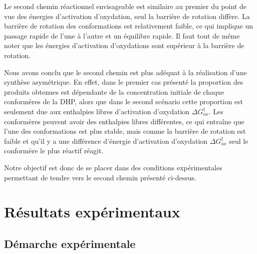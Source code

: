 \documentclass{article}
\begin{document}
Le second chemin réactionnel envisageable est similaire au premier du point de vue des énergies d’activation d’oxydation, seul la barrière de rotation diffère. La barrière de rotation des conformations est relativement faible, ce qui implique un passage rapide de l'une à l'autre et un équilibre rapide. Il faut tout de même noter que les énergies d’activation d’oxydations sont supérieur à la barrière de rotation.
\medbreak

Nous avons conclu que le second chemin est plus adéquat à la réalisation d’une synthèse asymétrique. En effet, dans le premier cas présenté la proportion des produits obtenues est dépendante de la concentration initiale de chaque conformères de la DHP, alors que dans le second scénario cette proportion est seulement due aux enthalpies libres d'activation d’oxydation $\Delta G^\ddagger_{ox}$. Les conformères peuvent avoir des enthalpies libres différentes, ce qui entraîne que l'une des conformations est plus stable, mais comme la barrière de rotation est faible et qu'il y a une différence d’énergie d’activation d’oxydation  $\Delta G^\ddagger_{ox}$ seul le conformère le plus réactif réagit.
\medbreak

Notre objectif est donc de se placer dans des conditions expérimentales permettant de tendre vers le second chemin présenté ci-dessus.



\newpage


\section{Résultats expérimentaux}



\subsection{Démarche expérimentale}
\end{document}
